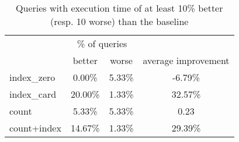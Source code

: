\documentclass[preview]{standalone}
\begin{document}
 
\begin{table}[!ht] 
\centering 
\begin{tabular}{lccc} 
& \multicolumn{2}{c}{\% of queries} \\\cline{2-3}& better & worse & average improvement \\ \hline 
index\_zero & 0.00\% & 5.33\% & -6.79\% \\ 
index\_card & 20.00\% & 1.33\% & 32.57\% \\ 
count & 5.33\% & 5.33\% & 0.23 \\ 
count+index & 14.67\% & 1.33\% & 29.39\% \\ 
\end{tabular} 
\caption{Queries with execution time of at least 10\% better (resp. 10 worse) than the baseline}
\end{table} 
\end{document}
